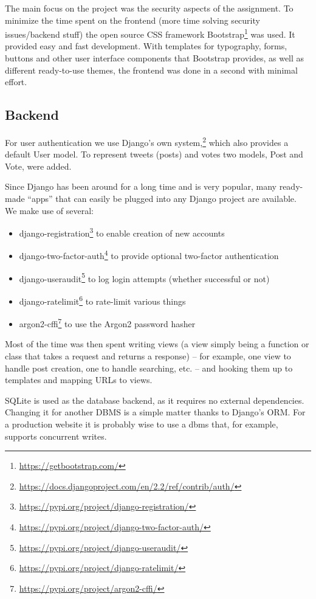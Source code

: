 \documentclass[11pt,english]{article}
\begin{document}
The main focus on the project was the security aspects of the assignment. To minimize the time spent on the frontend (more time solving security issues/backend stuff) the open source CSS framework Bootstrap\footnote{\url{https://getbootstrap.com/}} was used. It provided easy and fast development. With templates for typography, forms, buttons and other user interface components that Bootstrap provides, as well as different ready-to-use themes, the frontend was done in a second with minimal effort.

\subsection{Backend}

For user authentication we use Django’s own system,\footnote{\url{https://docs.djangoproject.com/en/2.2/ref/contrib/auth/}} which also provides a default User model. To represent tweets (posts) and votes two models, Post and Vote, were added.

Since Django has been around for a long time and is very popular, many ready-made “apps” that can easily be plugged into any Django project are available. We make use of several:

\begin{itemize}
  \item django-registration\footnote{\url{https://pypi.org/project/django-registration/}} to enable creation of new accounts
  \item django-two-factor-auth\footnote{\url{https://pypi.org/project/django-two-factor-auth/}} to provide optional two-factor authentication
  \item django-useraudit\footnote{\url{https://pypi.org/project/django-useraudit/}} to log login attempts (whether successful or not)
  \item django-ratelimit\footnote{\url{https://pypi.org/project/django-ratelimit/}} to rate-limit various things
  \item argon2-cffi\footnote{\url{https://pypi.org/project/argon2-cffi/}} to use the Argon2 password hasher
\end{itemize}

Most of the time was then spent writing views (a view simply being a function or class that takes a request and returns a response) -- for example, one view to handle post creation, one to handle searching, etc. -- and hooking them up to templates and mapping URLs to views.

SQLite is used as the database backend, as it requires no external dependencies. Changing it for another DBMS is a simple matter thanks to Django's ORM. For a production website it is probably wise to use a dbms that, for example, supports concurrent writes.
\end{document}
